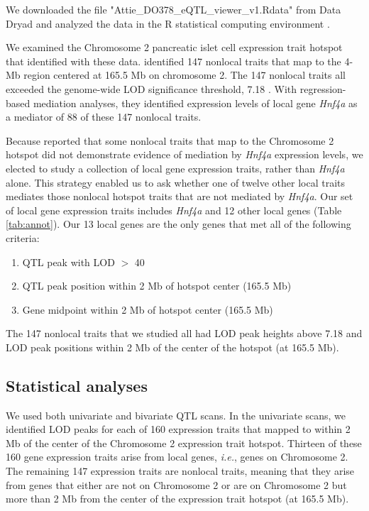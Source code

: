 \documentclass{article}
\begin{document}
We downloaded the file "Attie\_DO378\_eQTL\_viewer\_v1.Rdata" from Data Dryad \citep{keller2018genetic} and analyzed the data in the R statistical computing environment \citep{r}.

We examined the Chromosome 2 pancreatic islet cell expression trait hotspot that \citet{keller2018genetic} identified with these data. \citet{keller2018genetic} identified 147 nonlocal traits that map to the 4-Mb region centered at 165.5 Mb on chromosome 2. The 147 nonlocal traits all exceeded the genome-wide LOD significance threshold, 7.18 \citep{keller2018genetic}. With regression-based mediation analyses, they identified expression levels of local gene \emph{Hnf4a} as a mediator of 88 of these 147 nonlocal traits. 

Because \citet{keller2018genetic} reported that some nonlocal traits that map to the Chromosome 2 hotspot did not demonstrate evidence of mediation by \emph{Hnf4a} expression levels, we elected to study a collection of local gene expression traits, rather than \emph{Hnf4a} alone. This strategy enabled us to ask whether one of twelve other local traits mediates those nonlocal hotspot traits that are not mediated by \emph{Hnf4a}. Our set of local gene expression traits includes \emph{Hnf4a} and 12 other local genes (Table \ref{tab:annot}). Our 13 local genes are the only genes that met all of the following criteria:

\begin{enumerate}
    \item QTL peak with LOD $>$ 40
    \item QTL peak position within 2 Mb of hotspot center (165.5 Mb)
    \item Gene midpoint within 2 Mb of hotspot center (165.5 Mb)
\end{enumerate}

The 147 nonlocal traits that we studied all had LOD peak heights above 7.18 and LOD peak positions within 2 Mb of the center of the hotspot (at 165.5 Mb). 



\subsection{Statistical analyses}

We used both univariate and bivariate QTL scans. In the univariate scans, we identified LOD peaks for each of 160 expression traits that mapped to within 2 Mb of the center of the Chromosome 2 expression trait hotspot. Thirteen of these 160 gene expression traits arise from local genes, \emph{i.e.}, genes on Chromosome 2. The remaining 147 expression traits are nonlocal traits, meaning that they arise from genes that either are not on Chromosome 2 or are on Chromosome 2 but more than 2 Mb from the center of the expression trait hotspot (at 165.5 Mb). 
\end{document}
